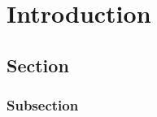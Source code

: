 \chapter{Introduction}
\label{ch:ch1}
\section{Section}
\label{sec:ch1.section1}
\subsection{Subsection}
\label{subsec:ch1.section1.subsec1}


